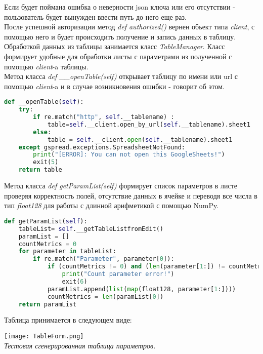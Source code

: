     Если будет поймана ошибка о неверности json ключа или его отсутствии - пользователь будет вынужден ввести путь до него еще раз.\\
    После успешной авторизации метод \textit{def authorized()} вернен обьект типа \textit{client}, с помощью него и будет происходить получение и запись данных в таблицу.\\
    
    Обработкой данных из таблицы занимается класс \textit{TableManager}. Класс формирует удобные для обработки листы с параметрами из полученной с помощью \textit{client}-a таблицы.\\
    Метод класса \textit{def \_\_openTable(self)} открывает таблицу по имени или url с помощью \textit{client}-a и в случае возникновения ошибки - говорит об этом.
     \begin{lstlisting}[language=Python]
def __openTable(self):
    try:
        if re.match("http", self.__tablename) :
            table=self.__client.open_by_url(self.__tablename).sheet1
        else:
            table = self.__client.open(self.__tablename).sheet1
    except gspread.exceptions.SpreadsheetNotFound:
        print("[ERROR]: You can not open this GoogleSheets!")
        exit(5)
    return table
    \end{lstlisting}
    
    Метод класса \textit{def getParamList(self)} формирует список параметров в листе проверяя корректность полей, отсутствие данных в ячейке и переводя все числа в тип \textit{float128} для работы с длинной арифметикой с помощью NumPy.
    \begin{lstlisting}[language=Python]
def getParamList(self):
    tableList= self.__getTableListfromEdit()
    paramList = []
    countMetrics = 0
    for parameter in tableList:
        if re.match("Parameter", parameter[0]):
            if (countMetrics != 0) and (len(parameter[1:]) != countMetrics):
                print("Count parameter error!")
                exit(6)
            paramList.append(list(map(float128, parameter[1:])))
            countMetrics = len(paramList[0])
    return paramList
    \end{lstlisting}
    
    \newpage
    Таблица принимается в следующем виде:
    \begin{center}
        \texttt{[image: TableForm.png]}\\
        \textit{Тестовая сгенерированная таблица параметров.}
    \end{center}
    
